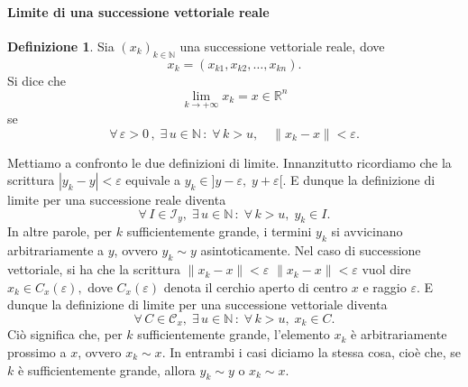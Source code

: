 \documentclass{article}
\theoremstyle{plain}
\theoremstyle{definition}
\newtheorem{defn}{Definizione}[section]
\theoremstyle{remark}
\begin{document}
\vspace{10pt}

\paragraph{Limite di una successione vettoriale reale}
\begin{bxthm}
\begin{defn}
    Sia $(x_k)_{k\in\mathbb{N}}$ una successione vettoriale reale, dove 
    \[x_k=(x_{k1}, x_{k2}, \dots, x_{kn}). \]
    Si dice che 
    \[\lim_{k\to+\infty} x_k = x \in \mathbb{R}^n\]
    se
    \[\forall\,\varepsilon>0\,,\; \exists\, u\in\mathbb{N}\,:\;\forall\, k>u,\quad \|x_k-x\|<\varepsilon.\]
\end{defn}
\end{bxthm}

\vspace{10pt}

Mettiamo a confronto le due definizioni di limite. Innanzitutto ricordiamo che la scrittura $|y_k - y| < \varepsilon$ equivale a $y_k \in ] y - \varepsilon,\; y + \varepsilon[$.
E dunque la definizione di limite per una successione reale diventa
\[
\forall\,I\in\mathcal{I}_y,\; \exists\, u\in\mathbb{N}\,:\; \forall\, k>u,\; y_k\in I.
\]
In altre parole, per $k$ sufficientemente grande, i termini $y_k$ si avvicinano arbitrariamente a $y$, ovvero $y_k \sim y$ asintoticamente.
Nel caso di successione vettoriale, si ha che la scrittura $\| x_k - x \| < \varepsilon$  $\| x_k - x \| < \varepsilon$ vuol dire $x_k \in C_{x}(\varepsilon),$
dove $C_{x}(\varepsilon)$ denota il cerchio aperto di centro $x$ e raggio $\varepsilon$. E dunque la definizione di limite per una successione vettoriale diventa
\[
\forall\, C\in\mathcal{C}_x,\; \exists\, u\in\mathbb{N}\,:\; \forall\, k>u,\; x_k\in C.
\]
Ciò significa che, per $k$ sufficientemente grande, l'elemento $x_k$ è arbitrariamente prossimo a $x$, ovvero $x_k \sim x$.
In entrambi i casi diciamo la stessa cosa, cioè che, se $k$ è sufficientemente grande, allora $y_k \sim y$ o $x_k \sim x$.

\vspace{10pt}
\end{document}
